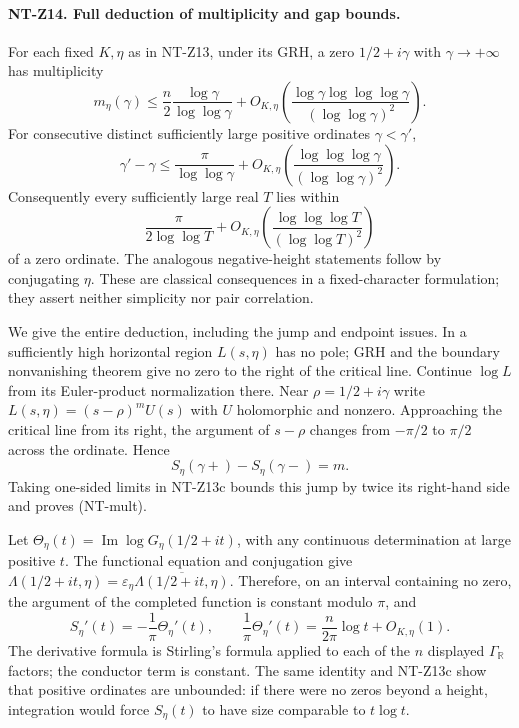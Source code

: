 \documentclass[11pt,a4paper]{article}
\begin{document}
\paragraph{NT-Z14. Full deduction of multiplicity and gap bounds.}
For each fixed $K,\eta$ as in NT-Z13, under its GRH, a zero
$1/2+i\gamma$ with $\gamma\to+\infty$ has multiplicity
\[
 m_\eta(\gamma)\le\frac n2\frac{\log\gamma}{\log\log\gamma}
   +O_{K,\eta}\left(
    \frac{\log\gamma\log\log\log\gamma}{(\log\log\gamma)^2}\right).
\tag{NT-mult}
\]
For consecutive distinct sufficiently large positive ordinates
$\gamma<\gamma'$,
\[
 \gamma'-\gamma\le\frac{\pi}{\log\log\gamma}
   +O_{K,\eta}\left(
    \frac{\log\log\log\gamma}{(\log\log\gamma)^2}\right).
\tag{NT-gap}
\]
Consequently every sufficiently large real $T$ lies within
\[
 \frac{\pi}{2\log\log T}
 +O_{K,\eta}\left(\frac{\log\log\log T}{(\log\log T)^2}\right)
\]
of a zero ordinate.  The analogous
negative-height statements follow by conjugating $\eta$.  These are
classical consequences in a fixed-character formulation; they assert
neither simplicity nor pair correlation.

We give the entire deduction, including the jump and endpoint issues.
In a sufficiently high horizontal region $L(s,\eta)$ has no pole;
GRH and the boundary nonvanishing theorem give no zero to the right
of the critical line.  Continue $\log L$ from its Euler-product
normalization there.  Near $\rho=1/2+i\gamma$ write
$L(s,\eta)=(s-\rho)^m U(s)$ with $U$ holomorphic and nonzero.
Approaching the critical line from its right, the argument of
$s-\rho$ changes from $-\pi/2$ to $\pi/2$ across the ordinate.
Hence
\[
 S_\eta(\gamma+)-S_\eta(\gamma-)=m.
\]
Taking one-sided limits in NT-Z13c bounds this jump by twice its
right-hand side and proves (NT-mult).

Let $\Theta_\eta(t)=\operatorname{Im}\log G_\eta(1/2+it)$, with
any continuous determination at large positive $t$.
The functional equation and conjugation give
$\Lambda(1/2+it,\eta)=\varepsilon_\eta
\overline{\Lambda(1/2+it,\eta)}$.
Therefore, on an interval containing no zero, the argument of the
completed function is constant modulo $\pi$, and
\[
 S_\eta'(t)=-\frac1\pi\Theta_\eta'(t),\qquad
 \frac1\pi\Theta_\eta'(t)
    =\frac n{2\pi}\log t+O_{K,\eta}(1).
\tag{NT-phase}
\]
The derivative formula is Stirling's formula applied to each of the
$n$ displayed $\Gamma_{\mathbb R}$ factors; the conductor term is
constant.  The same identity and NT-Z13c show that positive ordinates
are unbounded: if there were no zeros beyond a height, integration
would force $S_\eta(t)$ to have size comparable to $t\log t$.
\end{document}
